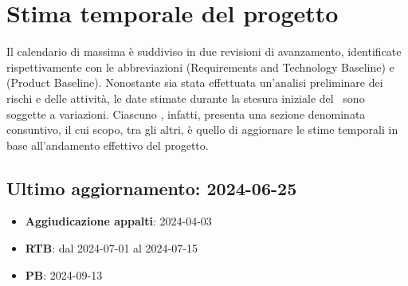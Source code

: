 \section{Stima temporale del progetto}
\label{sec:stima_temporale}

\par Il calendario di massima è suddiviso in due revisioni di avanzamento, identificate rispettivamente con le abbreviazioni  (Requirements and Technology Baseline) e  (Product Baseline). Nonostante sia stata effettuata un'analisi preliminare dei rischi e delle attività, le date stimate durante la stesura iniziale del \PdP\ sono soggette a variazioni. Ciascuno , infatti, presenta una sezione denominata consuntivo, il cui scopo, tra gli altri, è quello di aggiornare le stime temporali in base all'andamento effettivo del progetto.

\subsection{Ultimo aggiornamento: 2024-06-25}
\begin{itemize}
  \item \textbf{Aggiudicazione appalti}: 2024-04-03
  \item \textbf{RTB}: dal 2024-07-01 al 2024-07-15
  \item \textbf{PB}: 2024-09-13
\end{itemize}
